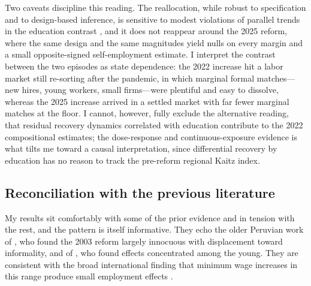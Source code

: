 Two caveats discipline this reading. The reallocation, while robust to specification and
to design-based inference, is sensitive to modest violations of parallel trends in the
education contrast \citep{rambachan_roth_2023}, and it does not reappear around the 2025
reform, where the same design and the same magnitudes yield nulls on every margin and a
small opposite-signed self-employment estimate. I interpret the contrast between the two
episodes as state dependence: the 2022 increase hit a labor market still re-sorting after
the pandemic, in which marginal formal matches---new hires, young workers, small
firms---were plentiful and easy to dissolve, whereas the 2025 increase arrived in a
settled market with far fewer marginal matches at the floor. I cannot, however, fully
exclude the alternative reading, that residual recovery dynamics correlated with
education contribute to the 2022 compositional estimates; the dose-response and
continuous-exposure evidence is what tilts me toward a causal interpretation, since
differential recovery by education has no reason to track the pre-reform regional Kaitz
index.

\subsection{Reconciliation with the previous literature}

My results sit comfortably with some of the prior evidence and in tension with the rest, and
the pattern is itself informative. They echo the older Peruvian work of
\citet{jaramillo_lopez_2006}, who found the 2003 reform largely innocuous with displacement
toward informality, and of \citet{cespedes_2005}, who found effects concentrated among the
young. They are consistent with the broad international finding that minimum wage increases in
this range produce small employment effects \citep{card_krueger_1995, cengiz_2019}.

